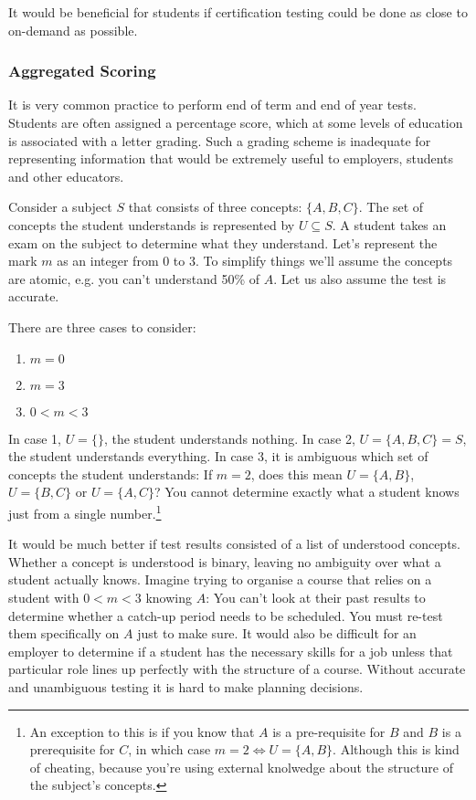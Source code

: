         It would be beneficial for students if certification testing could be done as close to on-demand as possible.

      \subsubsection{Aggregated Scoring}
        It is very common practice to perform end of term and end of year tests. Students are often assigned a percentage score, which at some levels of education is associated with a letter grading. Such a grading scheme is inadequate for representing information that would be extremely useful to employers, students and other educators.

        Consider a subject \(S\) that consists of three concepts: \(\{A, B, C\}\). The set of concepts the student understands is represented by \(U \subseteq S\). A student takes an exam on the subject to determine what they understand. Let's represent the mark \(m\) as an integer from 0 to 3. To simplify things we'll assume the concepts are atomic, e.g. you can't understand 50\% of \(A\). Let us also assume the test is accurate.

        There are three cases to consider:

        \begin{enumerate}
          \item \(m = 0\)
          \item \(m = 3\)
          \item \(0 < m < 3\)
        \end{enumerate}

        In case 1, \(U = \{\}\), the student understands nothing. In case 2, \(U = \{A, B, C\} = S\), the student understands everything. In case 3, it is ambiguous which set of concepts the student understands: If \(m = 2\), does this mean \(U = \{A, B\}\), \(U = \{B, C\}\) or \(U = \{A, C\}\)? You cannot determine exactly what a student knows just from a single number.\footnote{An exception to this is if you know that \(A\) is a pre-requisite for \(B\) and \(B\) is a prerequisite for \(C\), in which case \(m = 2 \iff U = \{A, B\}\). Although this is kind of cheating, because you're using external knolwedge about the structure of the subject's concepts.}

        It would be much better if test results consisted of a list of understood concepts. Whether a concept is understood is binary, leaving no ambiguity over what a student actually knows. Imagine trying to organise a course that relies on a student with \(0 < m < 3\) knowing \(A\): You can't look at their past results to determine whether a catch-up period needs to be scheduled. You must re-test them specifically on \(A\) just to make sure. It would also be difficult for an employer to determine if a student has the necessary skills for a job unless that particular role lines up perfectly with the structure of a course. Without accurate and unambiguous testing it is hard to make planning decisions.

